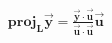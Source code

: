 \documentclass[preview]{standalone}
\begin{document}
\begin{align*}
\textbf{proj}_{\mathbf{L}}\mathbf{\vec{y}} = \frac{ \mathbf{\vec{y}} \cdot \mathbf{\vec{u}} }{ \mathbf{\vec{u}} \cdot \mathbf{\vec{u}} } \mathbf{\vec{u}}
\end{align*}
\end{document}
